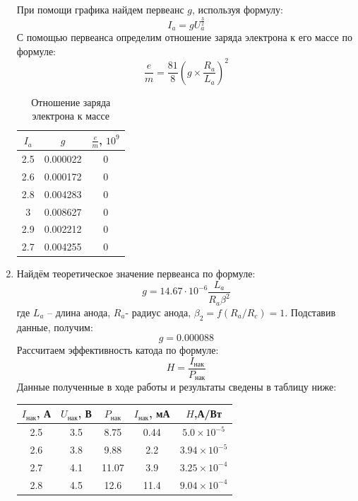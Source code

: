 \documentclass[a4paper, 12pt]{article}
\begin{document}
\begin{enumerate}
	При помощи графика найдем первеанс $g$, используя формулу:
	\begin{equation}
		I_{a}=gU_a^{\frac{3}{2}}
	\end{equation}
	С помощью первеанса определим отношение заряда электрона к его массе по формуле:
	\begin{equation}
		\frac{e}{m}=\frac{81}{8}\left(g\times\frac{R_a}{L_a}\right)^2
	\end{equation}
	\begin{table}[h]
		\centering
		\begin{tabular}{|c|c|c|}
			\hline
			$I_a$ & $g$ & $\frac{e}{m}$, $10^{9}$\\
			\hline
			2.5 & 0.000022 & 0\\
			2.6 & 0.000172 & 0\\
			2.8 & 0.004283 & 0\\
			3 & 0.008627 & 0\\
			2.9 & 0.002212 & 0\\
			2.7 & 0.004255 & 0\\
			\hline
		\end{tabular}
		\caption{Отношение заряда электрона к массе}
	\end{table}
	\item Найдём теоретическое значение первеанса по формуле:
	\begin{equation}
		g=14.67\cdot10^{-6}\frac{L_a}{R_a\beta^2}
	\end{equation}
	где $L_a$ – длина анода, $R_a$- радиус анода, $\beta_2=f(R_a/R_c) = 1$. Подставив данные, получим:
	\begin{equation*}
		g=0.000088
	\end{equation*}
	Рассчитаем эффективность катода по формуле:
	\begin{equation}
		H=\frac{I_{\text{нак}}}{P_{\text{нак}}}
	\end{equation}
	Данные полученные в ходе работы и результаты сведены в таблицу ниже:
	\begin{table}[h]
		\centering
		\begin{tabular}{|c|c|c|c|c|}
			\hline
			$I_{\text{нак}}$, А & $U_{\text{нак}}$, В & $P_{\text{нак}}$ & $I_{\text{нак}}$, мА & $H$,А/Вт\\
			\hline
			2.5 & 3.5 & 8.75 & 0.44 & $5.0\times10^{-5}$\\
			2.6 & 3.8 & 9.88 & 2.2 & $3.94\times10^{-5}$\\
			2.7 & 4.1 & 11.07 & 3.9 & $3.25\times10^{-4}$\\
			2.8 & 4.5 & 12.6 & 11.4 & $9.04\times10^{-4}$\\

\end{tabular}
\end{table}
\end{enumerate}
\end{document}

